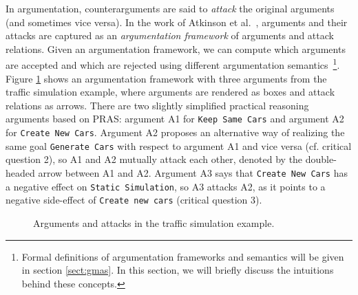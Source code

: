 In argumentation, counterarguments are said to \emph{attack} the original arguments (and sometimes vice versa). In the work of Atkinson et al.~\cite{atkinson2007}, arguments and their attacks are captured as an \emph{argumentation framework} of arguments and attack relations. Given an argumentation framework, we can compute which arguments are accepted and which are rejected using different argumentation semantics~\cite{Dung1995}\footnote{Formal definitions of argumentation frameworks and semantics will be given in section \ref{sect:gmas}. In this section, we will briefly discuss the intuitions behind these concepts.}. Figure \ref{fig:pras:example} shows an argumentation framework with three arguments from the traffic simulation example, where arguments are rendered as boxes and attack relations as arrows. There are two slightly simplified practical reasoning arguments based on PRAS: argument A1 for \texttt{Keep Same Cars} and argument A2 for \texttt{Create New Cars}. Argument A2 proposes an alternative way of realizing the same goal \texttt{Generate Cars} with respect to argument A1 and vice versa (cf. critical question 2), so A1 and A2 mutually attack each other, denoted by the double-headed arrow between A1 and A2. Argument A3 says that \texttt{Create New Cars} has a negative effect on \texttt{Static Simulation}, so A3 attacks A2, as it points to a negative side-effect of \texttt{Create new cars} (critical question 3). 

\begin{figure}[ht!]
\centering
{}
\caption{Arguments and attacks in the traffic simulation example.}
\label{fig:pras:example}
\end{figure}

